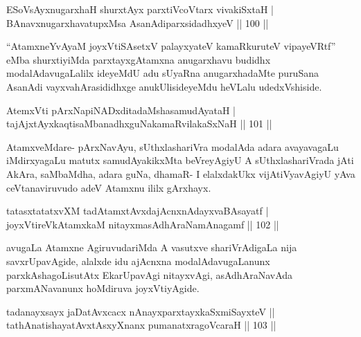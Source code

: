 \begin{shl}
ESoV\s sAyxnugarxhaH shurxtAyx parxtiVcoV\s tarx vivakiSxtaH | \\
BAnavxnugarxhavatupxMsa AsanAdiparxsidadhxyeV \hfill||  100 ||  
\end{shl}

\begin{artha}
``AtamxneYvAyaM joyxVtiSA\s \s setxV palayxyateV kamaRkuruteV vipayeVRtf'' eMba shurxtiyiMda parxtayxgAtamxna anugarxhavu budidhx modalAdavugaLalilx ideyeMdU adu sUyaRna anugarxhadaMte puruSana AsanAdi vayxvahArasididhxge anukUlisideyeMdu heVLalu udedxVshiside.
\end{artha}


\begin{shl}
AtemxVti pArxNapiNADxditadaMshasamudAyataH | \\
tajAjxtAyxkaqtisaMbanadhxguNakamaRvilakaSxNaH \hfill ||  101 ||  
\end{shl}

\begin{artha}
AtamxveMdare- pArxNavAyu, sUthxlashariVra modalAda adara avayavagaLu iMdirxyagaLu matutx samudAyakikxMta beVreyAgiyU A sUthxlashariVrada jAti AkAra, saMbaMdha, adara guNa, dhamaR- I elalxdakUkx vijAtiVyavAgiyU yAva ceVtanaviruvudo adeV Atamxnu ililx gArxhayx.
\end{artha}


\begin{shl}
tatasxtatatxvXM tadAtamxtAvxdajAcnxnAdayxvaBAsayatf | \\
joyxVtireVkAtamxkaM nitayxmasAdhAraNamAnagamf \hfill||  102 ||  
\end{shl}

\begin{artha}
avugaLa Atamxne AgiruvudariMda A vasutxve shariVrAdigaLa nija savxrUpavAgide, alalxde idu ajAcnxna modalAdavugaLanunx parxkAshagoLisutAtx EkarUpavAgi nitayxvAgi, asAdhAraNavAda parxmANavanunx hoMdiruva joyxVtiyAgide.
\end{artha}


\begin{shl}
tadanayxsayx jaDatAvxcacx nAnayxparxtayxkaSxmiSayxteV ||  \\
tathA\s natishayatAvxtAsxyXnanx pumanatxragoVcaraH \hfill||  103 ||  
\end{shl}

